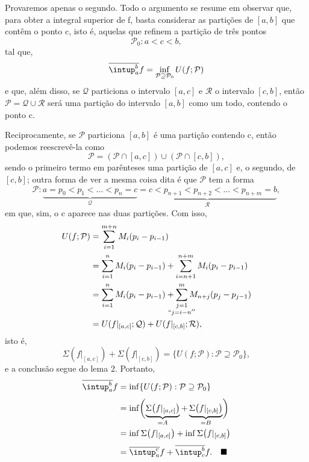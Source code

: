 \documentclass[../analysisII_notes.tex]{subfiles}
\begin{document}
\begin{proof*}
	Provaremos apenas o segundo. Todo o argumento se resume em observar que, para obter a integral superior de f, basta considerar as partições de \([a, b]\) que contêm o ponto c, isto é, aquelas que refinem a partição de três pontos
	\[
		\mathcal{P}_{0}: a < c < b,
	\]
	tal que,
	\[
		\overline{\intup_{a}^{b}}f = \inf_{\mathcal{P}\supseteq \mathcal{P}_{0}}U(f; \mathcal{P})
	\]
	e que, além disso, se \(\mathcal{Q}\) particiona o intervalo \([a, c]\) e \(\mathcal{R}\) o intervalo \([c, b]\), então \(\mathcal{P}=\mathcal{Q}\cup \mathcal{R}\) será uma partição do intervalo \([a, b]\) como um todo, contendo o ponto c.

	Reciprocamente, se \(\mathcal{P}\) particiona \([a, b]\) é uma partição contendo c, então podemos reescrevê-la como
	\[
		\mathcal{P}=(\mathcal{P}\cap [a, c])\cup (\mathcal{P}\cap [c, b]),
	\]
	sendo o primeiro termo em parênteses uma partição de \([a, c]\) e, o segundo, de \([c, b]\); outra forma de ver a mesma coisa dita é que \(\mathcal{P}\) tem a forma
	\[
		\mathcal{P}: \underbrace{a = p_{0} < p_{1} < \dotsc < p_{n}=c}_{\mathcal{Q}} \underbrace{=c< p_{n+1}<p_{n+2}<\dotsc <p_{n+m}=b}_{\mathcal{R}},
	\]
	em que, sim, o c aparece nas duas partições. Com isso,
	\begin{align*}
		U(f; \mathcal{P}) & = \sum\limits_{i=1}^{m+n}M_{i}(p_{i}-p_{i-1})                                              \\
		                  & =\sum\limits_{i=1}^{n}M_{i}(p_{i}-p_{i-1}) + \sum\limits_{i=n+1}^{n+m}M_{i}(p_{i}-p_{i-1}) \\
		                  & = \sum\limits_{i=1}^{n}M_{i}(p_{i}-p_{i-1}) + \sum\limits_{\mathclap{\substack{j=1         \\ ``j=i-n''}}}^{m}M_{n+j}(p_{j}-p_{j-1})\\
		                  & = U(f|_{[a, c]}; \mathcal{Q}) + U(f|_{[c, b]}; \mathcal{R}),
	\end{align*}
	isto é,
	\[
		\Sigma (f|_{[a, c]})+\Sigma (f|_{[c, b]})=\{U(f; \mathcal{P}):\mathcal{P}\supseteq \mathcal{P}_{0}\},
	\]
	e a conclusão segue do lema 2. Portanto,
	\begin{align*}
		\overline{\intup_{a}^{b}}f & = \inf_{}\{U(f; \mathcal{P}):\mathcal{P}\supseteq \mathcal{P}_{0}\}                                                        \\
		                           & = \inf_{}\biggl(\underbrace{\Sigma \bigl(f|_{[a, c]}\bigr)}_{=A} + \underbrace{\Sigma \bigl(f|_{[c, b]}\bigr)}_{=B}\biggr) \\
		                           & = \inf_{}\Sigma \bigl(f|_{[a, c]}\bigr) + \inf_{}\Sigma \bigl(f|_{[c, b]}\bigr)                                            \\
		                           & = \overline{\intup_{a}^{c}}f + \overline{\intup_{c}^{b}}f.\quad \text{\qedsymbol}
	\end{align*}
\end{proof*}
\end{document}

